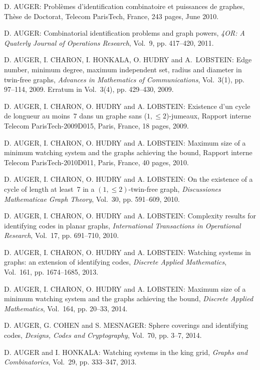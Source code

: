 \begin{thebibliography}{999}
D. AUGER: Probl\`emes d'identification combinatoire et puissances de graphes, Th\`ese de
Doctorat, Telecom ParisTech, France, 243 pages, June 2010.

D. AUGER: Combinatorial identification problems and graph powers, {\it 4OR: A Quaterly Journal of Operations Research}, Vol.~9, pp. 417--420, 2011.

D. AUGER, I. CHARON, I. HONKALA, O. HUDRY and A.~LOBSTEIN: Edge number, minimum degree, maximum independent set, radius and diameter in twin-free graphs, {\it Advances in Mathematics of Communications}, Vol.~3(1), pp. 97--114, 2009. Erratum in Vol.~3(4), pp. 429--430, 2009.

D. AUGER, I. CHARON, O. HUDRY and A. LOBSTEIN: Existence d'un cycle de longueur au moins~$7$ dans un graphe sans ($1,\leq 2$)-jumeaux, Rapport interne Telecom ParisTech-2009D015, Paris, France, 18 pages, 2009.

D. AUGER, I. CHARON, O. HUDRY and A. LOBSTEIN: Maximum size of a minimum watching system and the graphs achieving the bound, Rapport interne Telecom ParisTech-2010D011, Paris, France, 40 pages, 2010.

D. AUGER, I. CHARON, O. HUDRY and A. LOBSTEIN: On the existence of a cycle of length at least~7 in a $(1,\leq 2)$-twin-free graph, {\it Discussiones Mathematicae Graph Theory}, Vol.~30, pp. 591--609, 2010.

D. AUGER, I. CHARON, O. HUDRY and A. LOBSTEIN: Complexity results for identifying codes in planar graphs, {\it International Transactions in Operational Research}, Vol.~17, pp. 691--710, 2010.

D. AUGER, I. CHARON, O. HUDRY and A. LOBSTEIN: Watching systems in graphs: an extension of identifying codes, {\it Discrete Applied Mathematics}, Vol.~161, pp. 1674--1685, 2013.

D. AUGER, I. CHARON, O. HUDRY and A. LOBSTEIN: Maximum size of a minimum watching system and the graphs achieving the bound, {\it Discrete Applied Mathematics}, Vol.~164, pp. 20--33, 2014.

D. AUGER, G. COHEN and S. MESNAGER: Sphere coverings and identifying codes, {\it Designs, Codes and Cryptography}, Vol.~70, pp. 3--7, 2014.

D. AUGER and I. HONKALA: Watching systems in the king grid, {\it Graphs and Combinatorics}, Vol.~29, pp. 333--347, 2013.


\end{thebibliography}

